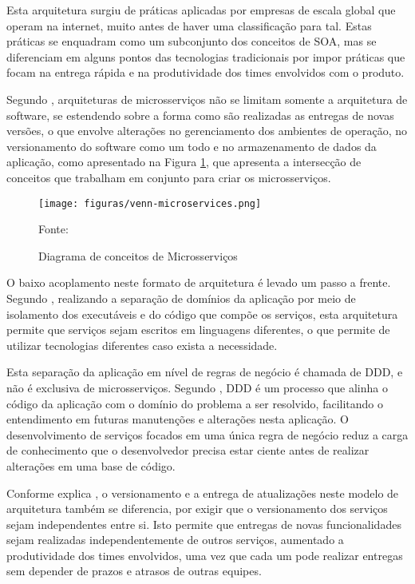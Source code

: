 Esta arquitetura surgiu de práticas aplicadas por empresas de escala global que
operam na internet, muito antes de haver uma classificação para tal. Estas
práticas se enquadram como um subconjunto dos conceitos de \ac{SOA}, mas se
diferenciam em alguns pontos das tecnologias tradicionais por impor práticas
que focam na entrega rápida e na produtividade dos times envolvidos com
o produto.

Segundo , arquiteturas de microsserviços não se limitam
somente a arquitetura de software, se estendendo sobre a forma como são
realizadas as entregas de novas versões, o que envolve alterações no
gerenciamento dos ambientes de operação, no versionamento do software como um
todo e no armazenamento de dados da aplicação, como apresentado na Figura
\ref{fig:venn-microservices}, que apresenta a intersecção de conceitos que
trabalham em conjunto para criar os microsserviços.

\begin{figure}[H]
	\centering
	\caption{Diagrama de conceitos de Microsserviços}
	\texttt{[image: figuras/venn-microservices.png]}

	\label{fig:venn-microservices}
	\footnotesize Fonte: 
\end{figure}

O baixo acoplamento neste formato de arquitetura é levado um passo a frente.
Segundo , realizando a separação de domínios da
aplicação por meio de isolamento dos executáveis e do código que compõe os
serviços, esta arquitetura permite que serviços sejam escritos em linguagens
diferentes, o que permite de utilizar tecnologias diferentes caso exista
a necessidade.

Esta separação da aplicação em nível de regras de negócio é chamada de \ac{DDD},
e não é exclusiva de microsserviços. Segundo , \ac{DDD}
é um processo que alinha o código da aplicação com o domínio do problema
a ser resolvido, facilitando o entendimento em futuras manutenções e
alterações nesta aplicação. O desenvolvimento de serviços focados em uma
única regra de negócio reduz a carga de conhecimento que o desenvolvedor
precisa estar ciente antes de realizar alterações em uma base de código.

Conforme explica , o versionamento e a entrega de
atualizações neste modelo de arquitetura também se diferencia, por exigir
que o versionamento dos serviços sejam independentes entre si. Isto permite
que entregas de novas funcionalidades sejam realizadas independentemente de
outros serviços, aumentado a produtividade dos times envolvidos, uma vez que
cada um pode realizar entregas sem depender de prazos e atrasos de outras
equipes.

